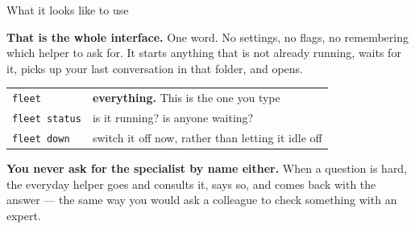 \documentclass[aspectratio=169]{beamer}
\newcommand{\keybox}[1]{%
  \begin{center}
  \colorbox{black!8}{\parbox{0.92\textwidth}{\centering #1}}
  \end{center}}
\begin{document}
\begin{frame}{What it looks like to use}

\begin{center}
\end{center}

\vspace{0.5em}
\keybox{\textbf{That is the whole interface.} One word. No settings, no flags, no remembering which
helper to ask for. It starts anything that is not already running, waits for it, picks up your last
conversation in that folder, and opens.}

\vspace{0.7em}
\begin{center}
\small
\begin{tabular}{@{}ll@{}}
\toprule
\texttt{fleet} & \textbf{everything.} This is the one you type \\
\texttt{fleet status} & is it running? is anyone waiting? \\
\texttt{fleet down} & switch it off now, rather than letting it idle off \\
\bottomrule
\end{tabular}
\end{center}

\vspace{0.5em}
{\small \textbf{You never ask for the specialist by name either.} When a question is hard, the
everyday helper goes and consults it, says so, and comes back with the answer --- the same way you
would ask a colleague to check something with an expert.}

\end{frame}
\end{document}
